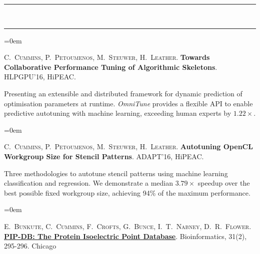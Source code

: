 \documentclass[a4paper,11pt,hidelinks]{scrartcl}
\newcommand{\MarginText}[1]{\marginpar{\raggedleft\itshape\normalsize#1}}
\newcommand{\Title}[1]{\noindent\rule{15cm}{0.4pt}\vspace{-.45em}\\
\noindent\spacedlowsmallcaps{\color{titlecolour}{#1}}

\vspace{-.85em}\noindent\rule{15cm}{0.4pt}\vspace{.2em}}
\newcommand{\Description}[1]{\hangindent=0em\hangafter=0%
\noindent\normalsize{#1}\vspace{1em}}
\newcommand{\Publication}[5]{\Description{\MarginText{#1}#2. \textbf{\href{#5}{#3}}. #4.}}
\begin{document}
\begin{cv}{}
\Title{Publications}



\Description{\MarginText{2016}C.\ \textsc{Cummins}, P.\
  \textsc{Petoumenos}, M.\ \textsc{Steuwer}, H.\
  \textsc{Leather}. \textbf{Towards Collaborative Performance Tuning
    of Algorithmic Skeletons}. HLPGPU'16, HiPEAC.\@
  \newline\vspace{-.8em}

  \noindent Presenting an extensible and distributed framework for
  dynamic prediction of optimisation parameters at
  runtime. \textit{OmniTune} provides a flexible API to enable
  predictive autotuning with machine learning, exceeding human experts
  by $1.22\times$.%
}

\Description{\MarginText{2016}C.\ \textsc{Cummins}, P.\
  \textsc{Petoumenos}, M.\ \textsc{Steuwer}, H.\
  \textsc{Leather}. \textbf{Autotuning OpenCL Workgroup Size for
    Stencil Patterns}. ADAPT'16, HiPEAC.\@ \newline\vspace{-.8em}

  \noindent Three methodologies to autotune stencil patterns using
  machine learning classification and regression. We demonstrate a
  median $3.79\times$ speedup over the best possible fixed workgroup
  size, achieving 94\% of the maximum performance.%
}

\Description{\MarginText{2015}E.\ \textsc{Bunkute}, C.\
  \textsc{Cummins}, F.\ \textsc{Crofts}, G.\ \textsc{Bunce}, I.\ T.\
  \textsc{Nabney}, D.\ R.\
  \textsc{Flower}. \textbf{\href{http://bioinformatics.oxfordjournals.org/content/31/2/295.full?etoc}{PIP-DB:
      The Protein Isoelectric Point Database}}. Bioinformatics, 31(2),
  295-296. Chicago \newline\vspace{-.8em}

}
\end{cv}
\end{document}
